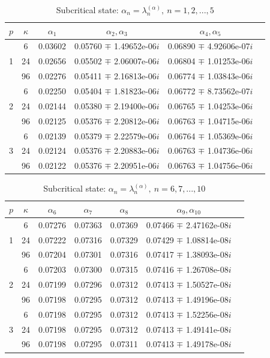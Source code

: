 \documentclass[authoryear]{elsarticle}
\begin{document}
\begin{table}[h]
\caption{Subcritical state: $\alpha_n = \lambda_n^{(\alpha )}, \ n = 1,2, ..., 5$}
\label{t-6}
\begin{center}
\begin{tabular}{cccccc}
\hline
$p$ & $\kappa$ & $\alpha_1$ &  $\alpha_2, \alpha_3$ &  $\alpha_4, \alpha_5$ \\ 
\hline
   & 6 & 0.03602 & 0.05760 $\mp$ 1.49652e-06$i$ & 0.06890 $\mp$ 4.92606e-07$i$ \\ 
1 & 24 & 0.02656 & 0.05502 $\mp$ 2.06007e-06$i$ & 0.06804 $\mp$ 1.01253e-06$i$ \\ 
  & 96 & 0.02276 & 0.05411 $\mp$ 2.16813e-06$i$ & 0.06774 $\mp$ 1.03843e-06$i$ \\ 
\hline
   & 6 & 0.02250 & 0.05404 $\mp$ 1.81823e-06$i$ & 0.06772 $\mp$ 8.73562e-07$i$ \\ 
2 & 24 & 0.02144 & 0.05380 $\mp$ 2.19400e-06$i$ & 0.06765 $\mp$ 1.04253e-06$i$ \\ 
  & 96 & 0.02125 & 0.05376 $\mp$ 2.20812e-06$i$ & 0.06763 $\mp$ 1.04715e-06$i$ \\ 
\hline
   & 6 & 0.02139 & 0.05379 $\mp$ 2.22579e-06$i$ & 0.06764 $\mp$ 1.05369e-06$i$ \\ 
3 & 24 & 0.02124 & 0.05376 $\mp$ 2.20883e-06$i$ & 0.06763 $\mp$ 1.04736e-06$i$ \\ 
  & 96 & 0.02122 & 0.05376 $\mp$ 2.20951e-06$i$ & 0.06763 $\mp$ 1.04756e-06$i$ \\ 
\hline
\end{tabular}
\end{center}
\end{table}

\begin{table}[h]
\caption{Subcritical state:  $\alpha_n = \lambda_n^{(\alpha )}, \ n = 6,7, ..., 10$}
\label{t-7}
\begin{center}
\begin{tabular}{ccccccc}
\hline
$p$ & $\kappa$ & $\alpha_6$ &  $\alpha_7$ & $\alpha_8$ &  $\alpha_9, \alpha_{10}$ \\ 
\hline
   & 6 & 0.07276 & 0.07363 & 0.07369 & 0.07466 $\mp$ 2.47162e-08$i$ \\ 
1 & 24 & 0.07222 & 0.07316 & 0.07329 & 0.07429 $\mp$ 1.08814e-08$i$ \\ 
  & 96 & 0.07204 & 0.07301 & 0.07316 & 0.07417 $\mp$ 1.38093e-08$i$ \\
\hline
   & 6 & 0.07203 & 0.07300 & 0.07315 & 0.07416 $\mp$ 1.26708e-08$i$ \\ 
2 & 24 & 0.07199 & 0.07296 & 0.07312 & 0.07413 $\mp$ 1.50527e-08$i$ \\ 
  & 96 & 0.07198 & 0.07295 & 0.07312 & 0.07413 $\mp$ 1.49196e-08$i$ \\ 
\hline
   & 6 & 0.07198 & 0.07295 & 0.07312 & 0.07413 $\mp$ 1.52256e-08$i$ \\ 
3 & 24 & 0.07198 & 0.07295 & 0.07312 & 0.07413 $\mp$ 1.49141e-08$i$ \\ 
  & 96 & 0.07198 & 0.07295 & 0.07311 & 0.07413 $\mp$ 1.49178e-08$i$ \\ 
\hline
\end{tabular}
\end{center}
\end{table}
\end{document}
